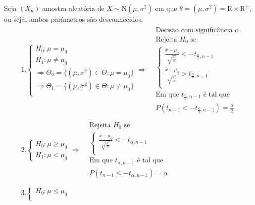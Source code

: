 \documentclass[
  letterpaper,
  DIV=11,
  numbers=noendperiod]{scrreprt}
\begin{document}
Seja \((X_{n})\) amostra aleatória de
\(X \sim \mathrm{N}(\mu,\sigma^2)\) em que
\(\theta = (\mu, \sigma^2) = \mathrm{R}
\times \mathrm{R}^+\), ou seja, ambos parâmetros são desconhecidos. \[
\begin{aligned}
&1.
\begin{cases}
H_{0} : \mu = \mu_{0}  \\
H_{1} : \mu \neq \mu_{0} \\
\Rightarrow \Theta_{0}=\{ (\mu,\sigma^2) \in \Theta : \mu = \mu_{0} \}\\
\Rightarrow \Theta_{1}=\{ (\mu,\sigma^2) \in \Theta : \mu \neq \mu_{0} \}\\ 
\end{cases} \Rightarrow 
\begin{aligned}
& \text{Decisão com significância } \alpha \\
&\text{Rejeita $H_{0}$ se} \\
&\begin{cases}
\frac{\bar{x}-\mu_{0}}{\sqrt{ \frac{s^2}{n} }} < - t_{\frac{\alpha}{2},n-1} \\
\frac{\bar{x}-\mu_{0}}{\sqrt{ \frac{s^2}{n} }} > t_{\frac{\alpha}{2},n-1} \\
\end{cases} \\
& \text{Em que $t_{\frac{\alpha}{2},n-1}$ é tal que} \\
& P\left( t_{n-1} < - t_{\frac{\alpha}{2},n-1} \right) = \frac{\alpha}{2}
\end{aligned} \\ \\
& 2.
\begin{cases}
H_{0} : \mu \geq \mu_{0} \\
H_{1}: \mu < \mu_{0}
\end{cases} \Rightarrow 
\begin{aligned}
&\text{Rejeita $H_{0}$ se} \\
&\begin{cases}
\frac{\bar{x}-\mu_{0}}{\sqrt{ \frac{s^2}{n} }} < - t_{\alpha,n-1} \\
\end{cases} \\
& \text{Em que $t_{\alpha,n-1}$ é tal que} \\
& P\left( t_{n-1}\leq -t_{\alpha,n-1} \right) = \alpha
\end{aligned} \\ \\
& 3.
\begin{cases}
H_{0} : \mu \leq \mu_{0} \\

\end{cases}
\end{aligned}\]
\end{document}
